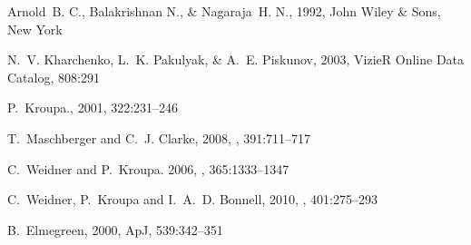 \documentclass{aastex}
\begin{document}
%
%
%
\begin{thebibliography}{1}

{Arnold}~B. C., {Balakrishnan} N., \& {Nagaraja}~H. N., 1992, John Wiley \& Sons, New York

N.~V. {Kharchenko}, L.~K. {Pakulyak}, \& A.~E. {Piskunov}, 2003, VizieR Online Data Catalog, 808:291

P.~{Kroupa}.\mnras, 2001, 322:231--246

T.~{Maschberger} and C.~J. {Clarke}, 2008, \mnras, 391:711--717

C.~{Weidner} and P.~{Kroupa}. 2006, \mnras, 365:1333--1347

C.~{Weidner}, P.~{Kroupa} and I.~A.~D. {Bonnell}, 2010, \mnras, 401:275--293

B.~{Elmegreen}, 2000, ApJ, 539:342--351
\end{thebibliography}
\end{document}
